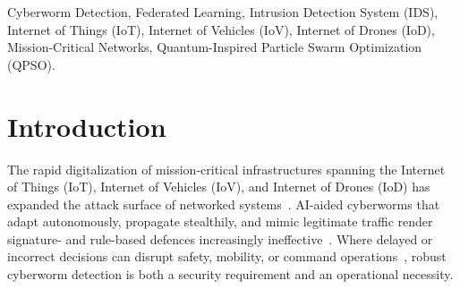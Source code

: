 \documentclass[conference]{IEEEtran}
\begin{document}
\begin{abstract}
AI-aided cyberworms that adapt their propagation and mimic legitimate traffic threaten mission-critical IoT/IoV/IoD networks, where detectors must remain accurate, lightweight, and robust across distributed sites. This paper proposes CONQUEST, a context-aware, quantum-inspired intrusion detection framework that integrates causal context features, variable-qubit quantum-inspired particle swarm optimization (QPSO) for feature selection, and an LSTM(+VAE) temporal classifier, trained centrally or by horizontal federated learning. Under a leakage-free temporal evaluation on ACI-IoT, CONQUEST achieves 97.13\% accuracy and F1-score, 0.9924 AUC, and the lowest missed-attack rate (3.33\%) among the evaluated pipelines. Multi-seed ablations show that detection is robust to the QPSO register size $Q\in\{1,\dots,10\}$ (Friedman $p\geq0.46$) and that context features and label-aware selection are complementary. The deployed detector classifies a traffic window in 2.98\,ms with 541\,MB peak memory. Under independent and identically distributed (IID) client
partitions, quantity-skew, and Dirichlet partitions, federated CONQUEST stays within 0.8\,pp of centralized F1, with a worst-client F1 of 96.37\% under quantity skew. These results establish CONQUEST as a reproducible, deployable cyberworm detector for mission-critical networks.
\end{abstract}

\begin{IEEEkeywords}
Cyberworm Detection, Federated Learning, Intrusion Detection System (IDS), Internet of Things (IoT), Internet of Vehicles (IoV), Internet of Drones (IoD), Mission-Critical Networks, Quantum-Inspired Particle Swarm Optimization (QPSO).  
\end{IEEEkeywords}


\section{Introduction}
\label{sec:introduction}
The rapid digitalization of mission-critical infrastructures spanning
the Internet of Things (IoT), Internet of Vehicles (IoV), and Internet
of Drones (IoD) has expanded the attack surface of networked
systems~\cite{dritsas, ajakwe2024facets}. AI-aided cyberworms that
adapt autonomously, propagate stealthily, and mimic legitimate
traffic render signature- and rule-based defences increasingly
ineffective~\cite{khezri}. Where delayed or incorrect decisions can
disrupt safety, mobility, or command operations~\cite{amadi2026blockchain},
robust cyberworm detection is both a security requirement and an
operational necessity.
\end{document}
